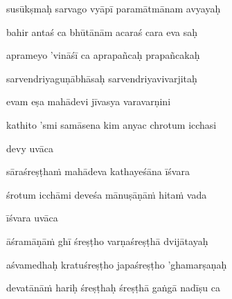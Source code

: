 susūkṣmaḥ sarvago vyāpī paramātmānam avyayaḥ\thinspace{\dandab} \dontdisplaylinenum

bahir antaś ca bhūtānām acaraś cara eva saḥ \veg\dontdisplaylinenum

aprameyo 'vināśī ca aprapañcaḥ prapañcakaḥ\thinspace{\dandab} \dontdisplaylinenum
            \var{\vab \om\ \msNb}%

sarvendriyaguṇābhāsaḥ sarvendriyavivarjitaḥ \veg\dontdisplaylinenum

evam eṣa mahādevi jīvasya varavarṇini\thinspace{\dandab} \dontdisplaylinenum

kathito 'smi samāsena kim anyac chrotum icchasi \veg\dontdisplaylinenum


devy uvāca~{\dandab}\dontdisplaylinenum 

sāraśreṣṭha\.m mahādeva kathayeśāna īśvara\thinspace{\danda} \dontdisplaylinenum

śrotum icchāmi deveśa mānuṣāṇā\.m hita\.m vada \veg\dontdisplaylinenum

īśvara uvāca~{\dandab}\dontdisplaylinenum 

āśramāṇā\.m ghī śreṣṭho varṇaśreṣṭhā dvijātayaḥ\thinspace{\danda} \dontdisplaylinenum

aśvamedhaḥ kratuśreṣṭho japaśreṣṭho 'ghamarṣaṇaḥ \veg\dontdisplaylinenum

devatānā\.m hariḥ śreṣṭhaḥ śreṣṭhā gaṅgā nadīṣu ca\thinspace{\dandab} \dontdisplaylinenum

